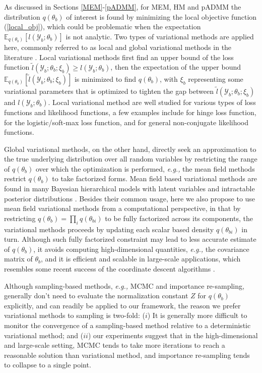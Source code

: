 \documentclass{article}
\newcommand{\eg}[0]{\emph{e.g., }}
\newcommand{\1}[0]{\ensuremath{\boldsymbol{1}}\xspace}
\begin{document}
As discussed in Sections \ref{MEM}-\ref{pADMM}, for MEM, HM and pADMM the distribution $q(\theta_b)$ of interest is found by minimizing the local objective function (\ref{local_obj}), which could be problematic when the expectation $\mathbb{E}_{q(\theta_b)}[l(\mathcal{Y}_b; \theta_b)]$ is not analytic. Two types of variational methods are applied here, commonly referred to as local and global variational methods in the literature \cite{Bishop2006}. Local variational methods first find an upper bound of the loss function $\tilde l(\mathcal{Y}_b; \theta_b; \xi_b) \ge  l(\mathcal{Y}_b; \theta_b)$, then the expectation of the upper bound $\mathbb{E}_{q(\theta_b)}[\tilde l(\mathcal{Y}_b; \theta_b; \xi_b)]$ is minimized to find $q(\theta_b)$, with $\xi_b$ representing some variational parameters that is optimized to tighten the gap between $\tilde l(\mathcal{Y}_b; \theta_b; \xi_b)$ and $l(\mathcal{Y}_b; \theta_b)$. Local variational method are well studied for various types of loss functions and likelihood functions, a few examples include \cite{Zhu2012} for hinge loss function, \cite{Jaakkola2000, Khan2010} for the logistic/soft-max loss function, and \cite{Khan2013, Wang2013} for general non-conjugate likelihood functions. 

Global variational methods, on the other hand, directly seek an approximation to the true underlying distribution over all random variables by restricting the range of $q(\theta_b)$ over which the optimization is performed, \eg the mean field methods restrict $q(\theta_b)$ to take factorized forms. Mean field based variational methods are found in many Bayesian hierarchical models with latent variables and intractable posterior distributions \cite{Wainwright2008}. Besides their common usage, here we also propose to use mean field variational methods from a computational perspective, in that by restricting $q(\theta_b) = \prod_i q(\theta_{bi})$ to be fully factorized across its components, the variational methods proceeds by updating each scalar based density $q(\theta_{bi})$ in turn. Although such fully factorized constraint may lead to less accurate estimate of $q(\theta_b)$, it avoids computing high-dimensional quantities, \eg the covariance matrix of $\theta_b$, and it is efficient and scalable in large-scale applications, which resembles some recent success of the coordinate descent algorithms \cite{Friedman2010, Bradley2011, Yuan2012, Yu2013}.

Although sampling-based methods, \eg MCMC and importance re-sampling, generally don't need to evaluate the normalization constant $Z$ for $q(\theta_b)$ explicitly, and can readily be applied to our framework, the reason we prefer variational methods to sampling is two-fold: ($i$) It is generally more difficult to monitor the convergence of a sampling-based method relative to a deterministic variational method; and ($ii$) our experiments suggest that in the high-dimensional and large-scale setting, MCMC tends to take more iterations to reach a reasonable solution than variational method, and importance re-sampling tends to collapse to a single point.
\end{document}

